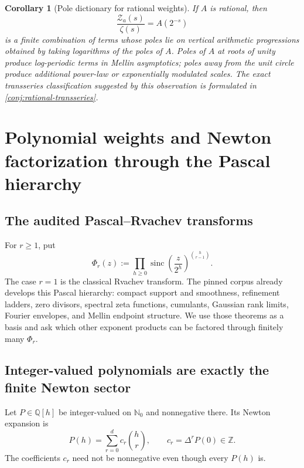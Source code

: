 \documentclass[11pt,oneside]{article}
\numberwithin{equation}{section}
\newtheorem{corollary}[theorem]{Corollary}
\theoremstyle{definition}
\theoremstyle{remark}
\newcommand{\Q}{\mathbb Q}
\newcommand{\N}{\mathbb N}
\newcommand{\Z}{\mathbb Z}
\newcommand{\sinc}{\operatorname{sinc}}
\newcommand{\Zspec}{\mathcal Z}
\begin{document}
\begin{corollary}[Pole dictionary for rational weights]
\label{cor:rational-poles}
If $A$ is rational, then
\begin{equation}
 \frac{\Zspec_a(s)}{\zeta(s)}=A(2^{-s})
 \label{eq:rational-zeta-quotient}
\end{equation}
is a finite combination of terms whose poles lie on vertical arithmetic progressions
obtained by taking logarithms of the poles of $A$.  Poles of $A$ at roots of unity produce
log-periodic terms in Mellin asymptotics; poles away from the unit circle produce additional
power-law or exponentially modulated scales.  The exact transseries classification suggested
by this observation is formulated in \cref{conj:rational-transseries}.
\end{corollary}


\section{Polynomial weights and Newton factorization through the Pascal hierarchy}
\label{sec:newton}

\subsection{The audited Pascal--Rvachev transforms}

For $r\ge1$, put
\begin{equation}
 \Phi_r(z)
 :=\prod_{h\ge0}\sinc\!\left(\frac z{2^h}\right)^{\binom h{r-1}}.
 \label{eq:pascal-transform}
\end{equation}
The case $r=1$ is the classical Rvachev transform.  The pinned corpus already develops this
Pascal hierarchy: compact support and smoothness, refinement ladders, zero divisors, spectral
zeta functions, cumulants, Gaussian rank limits, Fourier envelopes, and Mellin endpoint
structure.  We use those theorems as a basis and ask which other exponent products can be
factored through finitely many $\Phi_r$.

\subsection{Integer-valued polynomials are exactly the finite Newton sector}

Let $P\in\Q[h]$ be integer-valued on $\N_0$ and nonnegative there.  Its Newton expansion is
\begin{equation}
 P(h)=\sum_{r=0}^{d}c_r\binom hr,
 \qquad
 c_r=\Delta^rP(0)\in\Z.
 \label{eq:newton-expansion}
\end{equation}
The coefficients $c_r$ need not be nonnegative even though every $P(h)$ is.
\end{document}
